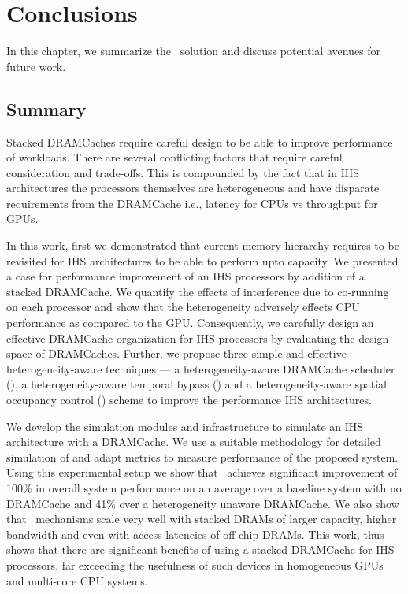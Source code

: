 \chapter{Conclusions} \label{chap:conclusion}
In this chapter, we summarize the \cachename\ solution and discuss potential avenues for future work.
\section{Summary}
Stacked DRAMCaches require careful design to be able to improve performance of workloads. There are several conflicting factors that require careful consideration and trade-offs. This is compounded by the fact that in IHS architectures the processors themselves are  heterogeneous and have disparate requirements from the DRAMCache i.e., latency for CPUs vs throughput for GPUs.
\par In this work, first we demonstrated that current memory hierarchy requires to be revisited for IHS architectures to be able to perform upto capacity. We presented a case for performance improvement of an IHS processors by addition of a stacked DRAMCache. 
We quantify the effects of interference due to co-running on each processor and show that the heterogeneity adversely effects CPU performance as compared to the GPU. 
Consequently, we carefully design an effective DRAMCache organization for IHS processors by evaluating the design space of DRAMCaches.
Further, we propose three simple and effective heterogeneity-aware techniques --- a heterogeneity-aware DRAMCache scheduler (\prioname), a heterogeneity-aware temporal bypass (\bypassname) and a heterogeneity-aware spatial occupancy control (\chaining) scheme to improve the performance IHS architectures.
\par We develop the simulation modules and infrastructure to simulate an IHS architecture with a DRAMCache. We use a suitable methodology for detailed simulation of \cachename and adapt metrics to measure performance of the proposed system. Using this experimental setup we show that 
\cachename\ achieves significant improvement of 100\% in overall system performance on an average over a baseline system with no DRAMCache and 41\% over a heterogeneity unaware DRAMCache. 
We also show that \cachename\ mechanisms scale very well with stacked DRAMs of larger capacity, higher bandwidth and even with access latencies of off-chip DRAMs.
This work, thus shows that there are significant benefits of using a stacked DRAMCache for IHS processors, far exceeding the usefulness of such devices in homogeneous GPUs and multi-core CPU systems.

